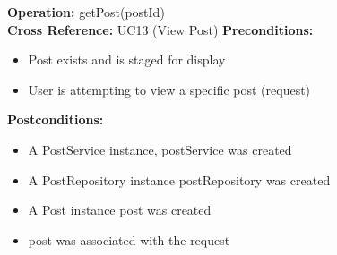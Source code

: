 \textbf{Operation:} getPost(postId) \\
\textbf{Cross Reference:} UC13 (View Post)
\textbf{Preconditions:}
\begin{itemize}
    \item Post exists and is staged for display
    \item User is attempting to view a specific post (request)
\end{itemize}
\textbf{Postconditions:}
\begin{itemize}
    \item A PostService instance, postService  was created
    \item A PostRepository instance postRepository was created
    \item A Post instance post was created
    \item post was associated with the request
\end{itemize}